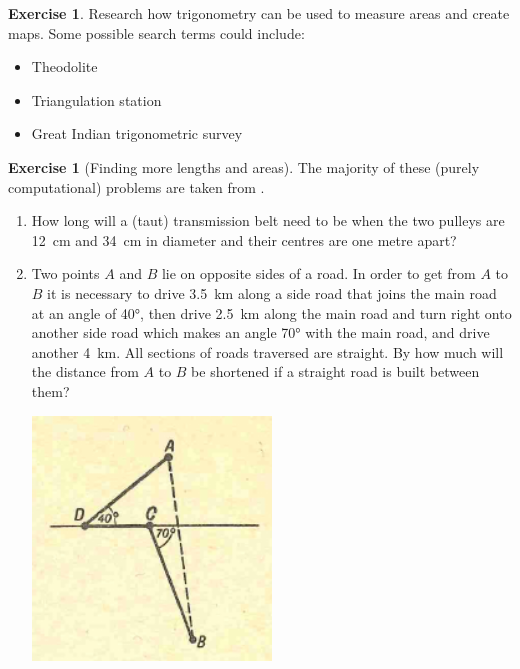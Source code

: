 \documentclass[a4paper]{report}
\theoremstyle{definition}
\newtheorem{exercise}[thm]{Exercise}
\begin{document}
  \begin{exercise}
    Research how trigonometry can be used to measure areas and create maps. Some possible search terms could include:
    \begin{itemize}
      \item Theodolite
      \item Triangulation station
      \item Great Indian trigonometric survey
    \end{itemize}
  \end{exercise}

  \begin{exercise}[Finding more lengths and areas]
    The majority of these (purely computational) problems are taken from \autocite{kutepov}.
    \begin{enumerate}
      \item How long will a  (taut) transmission belt need to be when the two pulleys are \SI{12}{\centi\metre} and \SI{34}{\centi\metre}
            in diameter and their centres are one metre apart?
      \item Two points $ A $ and $ B $ lie on opposite sides of a road. In order to get from $ A $ to $ B $ it is necessary to
            drive \SI{3.5}{\kilo\metre} along a side road that joins the main road at an angle of \ang{40}, then drive \SI{2.5}{\kilo\metre}
            along the main road and turn right onto another side road which makes an angle \ang{70} with the main road, and drive
            another \SI{4}{\kilo\metre}. All sections of roads traversed are straight. By how much will the distance from $ A $ to $ B $
            be shortened if a straight road is built between them?
            \begin{center}
              \includegraphics[width=0.5\textwidth]{roads}
            \end{center}
    \end{enumerate}
  \end{exercise}
\end{document}
